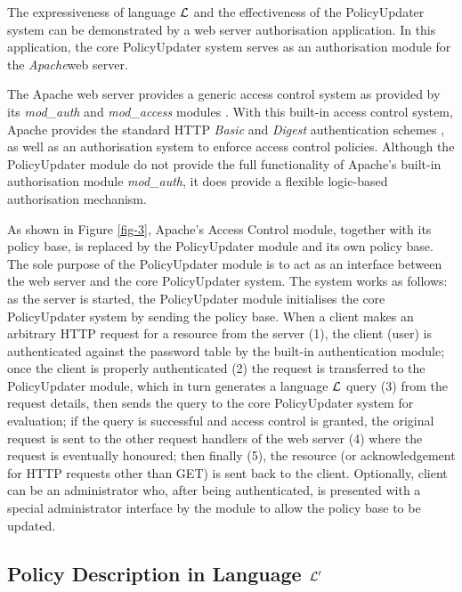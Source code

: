 \documentclass[global,twocolumn,final]{svjour}
\begin{document}
    The expressiveness of language $\cal{L}$ and the effectiveness of the
    PolicyUpdater system can be demonstrated by a web server authorisation
    application. In this application, the core PolicyUpdater system serves as
    an authorisation module for the {\em Apache}\footnotemark web server.


    The Apache web server provides a generic access control system as provided
    by its {\em mod\_auth} and {\em mod\_access} modules \cite{AP,LAU}. With
    this built-in access control system, Apache provides the standard HTTP
    {\em Basic} and {\em Digest} authentication schemes \cite{HTTP2}, as well
    as an authorisation system to enforce access control policies. Although the
    PolicyUpdater module do not provide the full functionality of Apache's
    built-in authorisation module {\em mod\_auth}, it does provide a flexible
    logic-based authorisation mechanism.

    As shown in Figure \ref{fig-3}, Apache's Access Control module, together
    with its policy base, is replaced by the PolicyUpdater module and its own
    policy base. The sole purpose of the PolicyUpdater module is to act as an
    interface between the web server and the core PolicyUpdater system. The
    system works as follows: as the server is started, the PolicyUpdater
    module initialises the core PolicyUpdater system by sending the policy
    base. When a client makes an arbitrary HTTP request for a resource from
    the server (1), the client (user) is authenticated against the password
    table by the built-in authentication module; once the client is properly
    authenticated (2) the request is transferred to the PolicyUpdater module,
    which in turn generates a language ${\cal L}$ query (3) from the request
    details, then sends the query to the core PolicyUpdater system for
    evaluation; if the query is successful and access control is granted,
    the original request is sent to the other request handlers of the web
    server (4) where the request is eventually honoured; then finally (5),
    the resource (or acknowledgement for HTTP requests other than GET) is sent
    back to the client. Optionally, client can be an administrator who,
    after being authenticated, is presented with a special administrator
    interface by the module to allow the policy base to be updated.

    \subsection{Policy Description in Language ${\cal L'}$}
\end{document}
